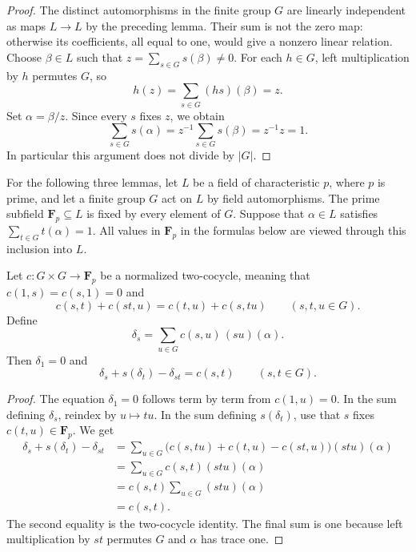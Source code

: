 \begin{proof}
The distinct automorphisms in the finite group $G$ are linearly
independent as maps $L\to L$ by the preceding lemma. Their sum
is not the zero map: otherwise its coefficients, all equal to
one, would give a nonzero linear relation. Choose $\beta\in L$
such that $z=\sum_{s\in G}s(\beta)\ne0$.
For each $h\in G$, left multiplication by $h$ permutes $G$, so
\[
 h(z)=\sum_{s\in G}(hs)(\beta)=z.
\]
Set $\alpha=\beta/z$. Since every $s$ fixes $z$, we obtain
\[
 \sum_{s\in G}s(\alpha)
   =z^{-1}\sum_{s\in G}s(\beta)=z^{-1}z=1.
\]
In particular this argument does not divide by $|G|$.
\end{proof}

For the following three lemmas, let $L$ be a field of
characteristic $p$, where $p$ is prime, and let a finite group
$G$ act on $L$ by field automorphisms. The prime subfield
$\mathbf F_p\subseteq L$ is fixed by every element of $G$.
Suppose that $\alpha\in L$ satisfies
$\sum_{t\in G}t(\alpha)=1$.
All values in $\mathbf F_p$ in the formulas below are viewed
through this inclusion into $L$.

\begin{lemma}
\label{lem:witt-two-cocycle-solution}
\leanok
Let $c:G\times G\to\mathbf F_p$ be a normalized two-cocycle,
meaning that $c(1,s)=c(s,1)=0$ and
\[
 c(s,t)+c(st,u)=c(t,u)+c(s,tu)
 \qquad(s,t,u\in G).
\]
Define
\[
 \delta_s=\sum_{u\in G}c(s,u)\,(su)(\alpha).
\]
Then $\delta_1=0$ and
\[
 \delta_s+s(\delta_t)-\delta_{st}=c(s,t)
 \qquad(s,t\in G).
\]
\end{lemma}

\begin{proof}
The equation $\delta_1=0$ follows term by term from $c(1,u)=0$.
In the sum defining $\delta_s$, reindex by $u\mapsto tu$.
In the sum defining $s(\delta_t)$, use that $s$ fixes
$c(t,u)\in\mathbf F_p$. We get
\[
\begin{aligned}
 \delta_s+s(\delta_t)-\delta_{st}
 &=\sum_{u\in G}
       \bigl(c(s,tu)+c(t,u)-c(st,u)\bigr)(stu)(\alpha)\\
 &=\sum_{u\in G}c(s,t)(stu)(\alpha)\\
 &=c(s,t)\sum_{u\in G}(stu)(\alpha)\\
 &=c(s,t).
\end{aligned}
\]
The second equality is the two-cocycle identity. The final sum
is one because left multiplication by $st$ permutes $G$ and
$\alpha$ has trace one.
\end{proof}

